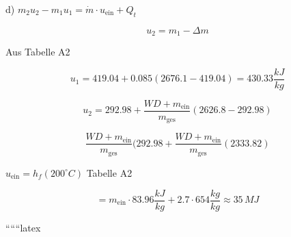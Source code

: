 d) $m_2 u_2 - m_1 u_1 = \dot{m} \cdot u_{\text{ein}} + Q_t$

\[
u_2 = m_1 - \Delta m
\]

Aus Tabelle A2

\[
u_1 = 419.04 + 0.085 (2676.1 - 419.04) = 430.33 \frac{kJ}{kg}
\]

\[
u_2 = 292.98 + \frac{WD + m_{\text{ein}}}{m_{\text{ges}}} (2626.8 - 292.98)
\]

\[
\frac{WD + m_{\text{ein}}}{m_{\text{ges}}} (292.98 + \frac{WD + m_{\text{ein}}}{m_{\text{ges}}} (2333.82)
\]

$u_{\text{ein}} = h_f(200^\circ C)$ Tabelle A2

\[
= m_{\text{ein}} \cdot 83.96 \frac{kJ}{kg} + 2.7 \cdot 654 \frac{kg}{kg} \approx 35 \, MJ
\]

``````latex